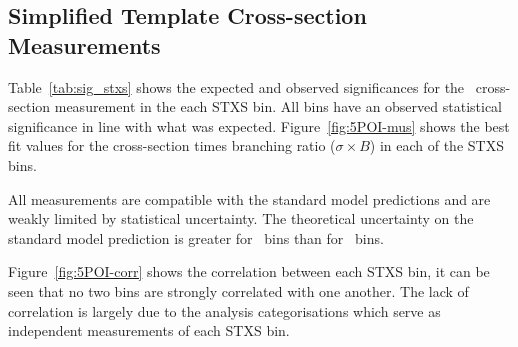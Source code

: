 \subsection{Simplified Template Cross-section Measurements}
Table~\ref{tab:sig_stxs} shows the expected and observed significances for
the \VHbb\ cross-section measurement in the each STXS bin. All bins have an
observed statistical significance in line with what was expected.
Figure~\ref{fig:5POI-mus} shows the best fit values for the cross-section times
branching ratio ($\sigma \times B$) in each of the STXS bins.

All measurements are compatible with the standard model predictions and are
weakly limited by statistical uncertainty. The theoretical uncertainty on the
standard  model prediction is greater for \ZH\ bins than for \WH\ bins.

Figure~\ref{fig:5POI-corr} shows the correlation between each STXS bin, it can
be seen that no two bins are strongly correlated with one another. The lack of
correlation is largely due to the analysis categorisations which serve as
independent measurements of each STXS bin.

%
%
